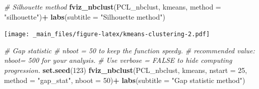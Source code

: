 \documentclass[
]{book}
\newenvironment{Shaded}{\begin{snugshade}}{\end{snugshade}}
\newcommand{\AttributeTok}[1]{\textcolor[rgb]{0.13,0.29,0.53}{#1}}
\newcommand{\CommentTok}[1]{\textcolor[rgb]{0.56,0.35,0.01}{\textit{#1}}}
\newcommand{\DecValTok}[1]{\textcolor[rgb]{0.00,0.00,0.81}{#1}}
\newcommand{\FunctionTok}[1]{\textcolor[rgb]{0.13,0.29,0.53}{\textbf{#1}}}
\newcommand{\NormalTok}[1]{#1}
\newcommand{\SpecialCharTok}[1]{\textcolor[rgb]{0.81,0.36,0.00}{\textbf{#1}}}
\newcommand{\StringTok}[1]{\textcolor[rgb]{0.31,0.60,0.02}{#1}}
\begin{document}
\begin{Shaded}
\begin{Highlighting}[]
\CommentTok{\# Silhouette method}
\FunctionTok{fviz\_nbclust}\NormalTok{(PCL\_nbclust, kmeans, }\AttributeTok{method =} \StringTok{"silhouette"}\NormalTok{)}\SpecialCharTok{+}
  \FunctionTok{labs}\NormalTok{(}\AttributeTok{subtitle =} \StringTok{"Silhouette method"}\NormalTok{)}
\end{Highlighting}
\end{Shaded}

\texttt{[image: \_main\_files/figure-latex/kmeans-clustering-2.pdf]}

\begin{Shaded}
\begin{Highlighting}[]
\CommentTok{\# Gap statistic}
\CommentTok{\# nboot = 50 to keep the function speedy. }
\CommentTok{\# recommended value: nboot= 500 for your analysis.}
\CommentTok{\# Use verbose = FALSE to hide computing progression.}
\FunctionTok{set.seed}\NormalTok{(}\DecValTok{123}\NormalTok{)}
\FunctionTok{fviz\_nbclust}\NormalTok{(PCL\_nbclust, kmeans, }\AttributeTok{nstart =} \DecValTok{25}\NormalTok{,  }\AttributeTok{method =} \StringTok{"gap\_stat"}\NormalTok{, }\AttributeTok{nboot =} \DecValTok{50}\NormalTok{)}\SpecialCharTok{+}
  \FunctionTok{labs}\NormalTok{(}\AttributeTok{subtitle =} \StringTok{"Gap statistic method"}\NormalTok{)}
\end{Highlighting}
\end{Shaded}
\end{document}
